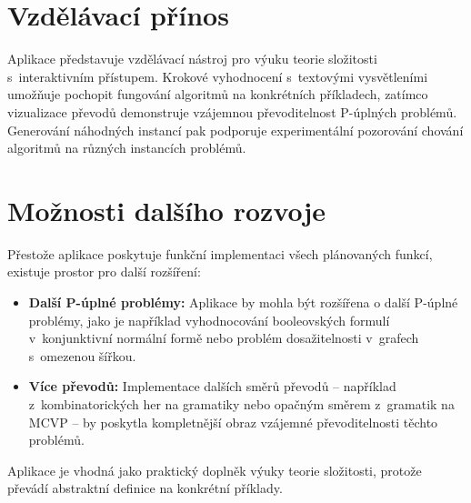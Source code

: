 \section{Vzdělávací přínos}
\label{sec:ConclusionEducational}

Aplikace představuje vzdělávací nástroj pro výuku teorie složitosti s~interaktivním přístupem. Krokové vyhodnocení s~textovými vysvětleními umožňuje pochopit fungování algoritmů na konkrétních příkladech, zatímco vizualizace převodů demonstruje vzájemnou převoditelnost P-úplných problémů. Generování náhodných instancí pak podporuje experimentální pozorování chování algoritmů na různých instancích problémů.

\section{Možnosti dalšího rozvoje}
\label{sec:ConclusionFutureWork}

Přestože aplikace poskytuje funkční implementaci všech plánovaných funkcí, existuje prostor pro další rozšíření:

\begin{itemize}
    \item \textbf{Další P-úplné problémy:} Aplikace by mohla být rozšířena o další P-úplné problémy, jako je například vyhodnocování booleovských formulí v~konjunktivní normální formě nebo problém dosažitelnosti v~grafech s~omezenou šířkou.
    
    \item \textbf{Více převodů:} Implementace dalších směrů převodů – například z~kombinatorických her na gramatiky nebo opačným směrem z~gramatik na MCVP – by poskytla kompletnější obraz vzájemné převoditelnosti těchto problémů.
\end{itemize}

Aplikace je vhodná jako praktický doplněk výuky teorie složitosti, protože převádí abstraktní definice na konkrétní příklady.

\endinput
